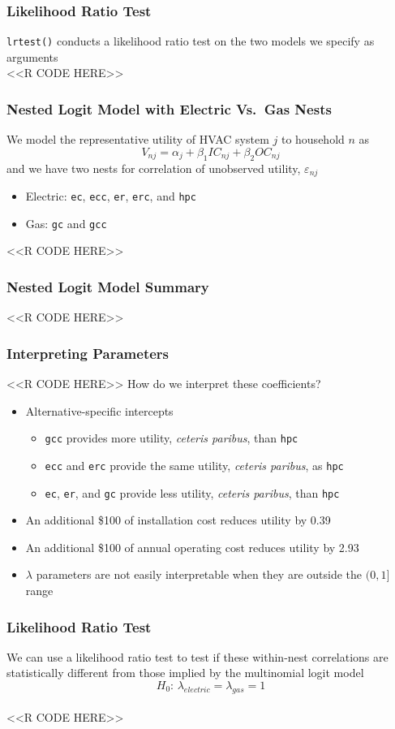 \documentclass{beamer}
\begin{document}
\begin{frame}[fragile]\frametitle{Likelihood Ratio Test}
    \texttt{lrtest()} conducts a likelihood ratio test on the two models we specify as arguments \\
    <<R CODE HERE>>
\end{frame}

\begin{frame}[fragile]\frametitle{Nested Logit Model with Electric Vs.\ Gas Nests}
    We model the representative utility of HVAC system $j$ to household $n$ as
    $$V_{nj} = \alpha_j + \beta_1 IC_{nj} + \beta_2 OC_{nj}$$
    and we have two nests for correlation of unobserved utility, $\varepsilon_{nj}$
    \begin{itemize}
    	\item Electric: \texttt{ec}, \texttt{ecc}, \texttt{er}, \texttt{erc}, and \texttt{hpc}
    	\item Gas: \texttt{gc} and \texttt{gcc}
    \end{itemize}
    <<R CODE HERE>>
\end{frame}

\begin{frame}[fragile]\frametitle{Nested Logit Model Summary}
	\vspace{1ex}
    <<R CODE HERE>>
\end{frame}

\begin{frame}[fragile]\frametitle{Interpreting Parameters}
    <<R CODE HERE>>
    \vspace{2ex}
    How do we interpret these coefficients?
    \begin{itemize}
    	\item Alternative-specific intercepts
    	\begin{itemize}
    		\item \texttt{gcc} provides more utility, \emph{ceteris paribus}, than \texttt{hpc}
	        \item \texttt{ecc} and \texttt{erc} provide the same utility, \emph{ceteris paribus}, as \texttt{hpc}
	        \item \texttt{ec}, \texttt{er}, and \texttt{gc} provide less utility, \emph{ceteris paribus}, than \texttt{hpc}
        \end{itemize}
        \item An additional \$100 of installation cost reduces utility by 0.39
        \item An additional \$100 of annual operating cost reduces utility by 2.93
        \item $\lambda$ parameters are not easily interpretable when they are outside the $(0, 1]$ range
    \end{itemize}
\end{frame}

\begin{frame}[fragile]\frametitle{Likelihood Ratio Test}
    We can use a likelihood ratio test to test if these within-nest correlations are statistically different from those implied by the multinomial logit model
    $$H_0 \text{: } \lambda_{electric} = \lambda_{gas} = 1$$ \\
    <<R CODE HERE>>
\end{frame}
\end{document}
